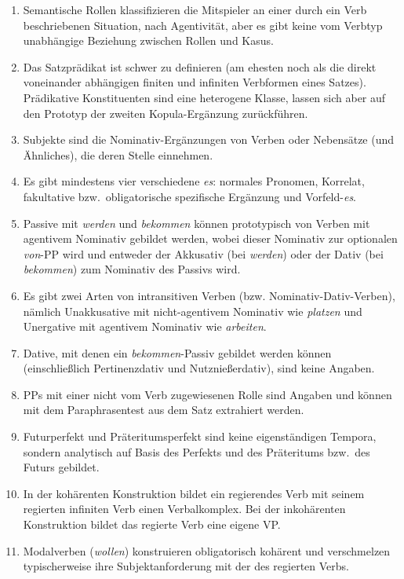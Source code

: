 \begin{sloppypar}

\begin{enumerate}\Lf
  \item Semantische Rollen klassifizieren die Mitspieler an einer durch ein Verb beschriebenen Situation, \zB nach Agentivität, aber es gibt keine vom Verbtyp unabhängige Beziehung zwischen Rollen und Kasus.
  \item Das Satzprädikat ist schwer zu definieren (am ehesten noch als die direkt voneinander abhängigen finiten und infiniten Verbformen eines Satzes).
    Prädikative Konstituenten sind eine heterogene Klasse, lassen sich aber auf den Prototyp der zweiten Kopula-Ergänzung zurückführen.
  \item Subjekte sind die Nominativ-Ergänzungen von Verben oder Nebensätze (und Ähnliches), die deren Stelle einnehmen.
  \item Es gibt mindestens vier verschiedene \textit{es}: normales Pronomen, Korrelat, fakultative bzw.\ obligatorische spezifische Ergänzung und Vorfeld-\textit{es}.
  \item Passive mit \textit{werden} und \textit{bekommen} können prototypisch von Verben mit agentivem Nominativ gebildet werden, wobei dieser Nominativ zur optionalen \textit{von}-PP wird und entweder der Akkusativ (bei \textit{werden}) oder der Dativ (bei \textit{bekommen}) zum Nominativ des Passivs wird.
  \item Es gibt zwei Arten von intransitiven Verben (bzw. Nominativ-Dativ-Verben), nämlich Unakkusative mit nicht-agentivem Nominativ wie \textit{platzen} und Unergative mit agentivem Nominativ wie \textit{arbeiten}.
  \item Dative, mit denen ein \textit{bekommen}-Passiv gebildet werden können (einschließlich Pertinenzdativ und Nutznießerdativ), sind keine Angaben.
  \item PPs mit einer nicht vom Verb zugewiesenen Rolle sind Angaben und können mit dem Paraphrasentest aus dem Satz extrahiert werden.
  \item Futurperfekt und Präteritumsperfekt sind keine eigenständigen Tempora, sondern analytisch auf Basis des Perfekts und des Präteritums bzw.\ des Futurs gebildet.
  \item In der kohärenten Konstruktion bildet ein regierendes Verb mit seinem regierten infiniten Verb einen Verbalkomplex.
    Bei der inkohärenten Konstruktion bildet das regierte Verb eine eigene VP.
  \item Modalverben (\textit{wollen}) konstruieren obligatorisch kohärent und verschmelzen typischerweise ihre Subjektanforderung mit der des regierten Verbs.

\end{enumerate}
\end{sloppypar}
